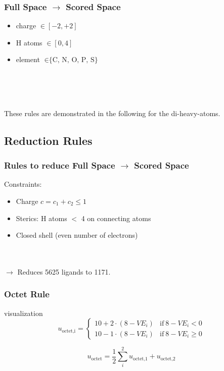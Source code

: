\documentclass[xcolor=dvipsnames]{beamer}
\begin{document}
\begin{frame}
\frametitle{Full Space $\rightarrow$ Scored Space}
\begin{itemize}
\item charge $\in [-2,+2]$
\item H atoms $\in [0,4]$
\item element $\in \textrm{\{C,~N,~O,~P,~S\}}$
\end{itemize}
~\\
~\\
~\\
These rules are demonstrated in the following for the di-heavy-atoms.
\end{frame}

\subsection{Reduction Rules}

\begin{frame}
\frametitle{Rules to reduce Full Space $\rightarrow$ Scored Space}
Constraints:
\begin{itemize}
	\item Charge $c = c_1 + c_2 \leq 1 $
	\item Sterics: H atoms $<$ 4 on connecting atoms
	\item Closed shell (even number of electrons)
\end{itemize}
~\\
~\\
$\rightarrow$ Reduces 5625 ligands to 1171.
\end{frame}


\begin{frame}
\frametitle{Octet Rule}
visualization
\begin{equation}
u_{\textrm{octet,i}} = 
\begin{cases}
 10 + 2 \cdot (8-VE_i) 	& \mathrm{if}~ 8-VE_i < 0 \\
 10 - 1 \cdot (8-VE_i) 	& \mathrm{if}~ 8-VE_i \geq 0
\end{cases}
\end{equation}

\begin{equation}
u_{\textrm{octet}} = \frac{1}{2} \sum_i^2 u_{\textrm{octet,1}} + u_{\textrm{octet,2}} 
\end{equation}
\end{frame}
\end{document}
